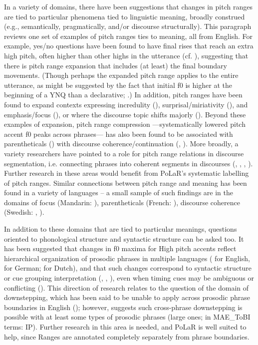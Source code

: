 In a variety of domains, there have been suggestions that changes in pitch ranges are tied to particular phenomena tied to linguistic meaning, broadly construed (e.g., semantically, pragmatically, and/or discourse structurally). This paragraph reviews one set of examples of pitch ranges ties to meaning, all from English. For example, yes/no questions have been found to have final rises that reach an extra high pitch, often higher than other highs in the utterance (cf. \citealt{pierrehumbert80}), suggesting that there is pitch range expansion that includes (at least) the final boundary movements. (Though perhaps the expanded pitch range applies to the entire utterance, as might be  suggested by the fact that initial f0 is higher at the beginning of a YNQ than a declarative; \citealt{sicoli-15}.) In addition, pitch ranges have been found to expand contexts expressing incredulity (\citealt{hirschbergward92}), surprisal\slash miriativity (\citealt{rett-20}), and emphasis\slash focus (\citealt{xuxu05}), or where the discourse topic shifts majorly (\citealt{hirschbergpierrehumbert86}). Beyond these examples of expansion, pitch range compression —systematically lowered pitch accent f0 peaks across phrases— has also been found to be associated with parentheticals (\citealt{price-91, dehe09}) with discourse coherence\slash continuation (\citealt{beckman93}, \citealt{bruce-97}). More broadly, a variety researchers have pointed to a role for pitch range relations in discourse segmentation, i.e. connecting phrases into coherent segments in discourses (\citealt{hirst93a}, \citealt{wichmann00}, \citealt{hirschberg04}, \citealt{lin-11}). Further research in these areas would benefit from PoLaR’s systematic labelling of pitch ranges.  Similar connections between pitch range and meaning has been found in a variety of languages – a small sample of such findings are in the domains of focus (Mandarin: \citealt{xu99}), parentheticals (French: \citealt{fagyal02}), discourse coherence (Swedish: \citealt{hansson03}, \citealt{carlson-05}).

In addition to these domains that are tied to particular meanings, questions oriented to phonological structure and syntactic structure can be asked too. It has been suggested that changes in f0 maxima for High pitch accents reflect hierarchical organization of prosodic phrases in multiple languages (\citealt{ladd88} for English, \citealt{fery-05} for German; \citealt{berg-92} for Dutch), and that such changes correspond to syntactic structure or cue grouping interpretation (\citealt{ladd88, ladd92}, \citealt{fery-05}, \citealt{kentnerfery13}), even when timing cues may be ambiguous or conflicting (\citealt{brugos15}). This direction of research relates to the question of the domain of downstepping, which has been said to be unable to apply across prosodic phrase boundaries in English (\citealt{beckmanayers97}); however, \citealt{sturman19} suggests such cross-phrase downstepping is possible with at least some types of prosodic phrases (large ones; in MAE\_ToBI terms: IP). Further research in this area is needed, and PoLaR is well suited to help, since Ranges are annotated completely separately from phrase boundaries.

